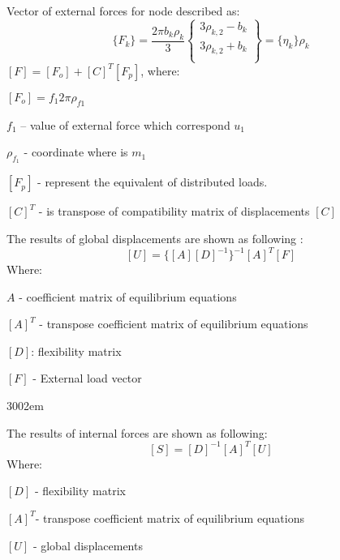 Vector of external forces for node described as:
\begin{equation}\label{eqn:ExtrLoad}
    \{F_k\}=
    \frac{2\pi b_k\rho_k}{3}
    \left\{\begin{matrix}
        3\rho_{k,2}-b_k \\[2ex]
        3\rho_{k,2}+b_k \\[2ex]
    \end{matrix}\right\}
    =
    \{\eta_k\}\rho_k
\end{equation}
$[F]=[F_o]+[C]^T[F_p]$, where:\par
$[F_o]=f_1 2\pi \rho_{f1} $\par
$f_1$ – value of external force which correspond $u_1$\par
$\rho_{f_1}$ - coordinate where is $m_1$\par
$[F_p]$ - represent the equivalent of distributed loads.\par
$[C]^T$ - is transpose of compatibility matrix of displacements $[C]$\par
{\noindent \footnotesize }
The results of global displacements are shown as following : 
\begin{equation}\label{eqn:Uglob}
    [U]=\{[A][D]^{-1}\}^{-1}[A]^T[F]
\end{equation}
Where:\par
$A$ - coefficient matrix of equilibrium equations\par
$[A]^T$ - transpose coefficient matrix of equilibrium equations\par
$[D]$: flexibility matrix\par
$[F]$ - External load vector\par
\begin{xtolerant}{300}{2em}
    {\noindent \footnotesize }
  \end{xtolerant}
\par
The results of internal forces are shown as following: 
\begin{equation}\label{eqn:Ulocal}
    [S]=[D]^{-1}[A]^T[U]
\end{equation}
Where:\par
$[D]$ - flexibility matrix \par 
$[A]^T$- transpose coefficient matrix of equilibrium equations\par 
$[U]$ - global displacements\par

